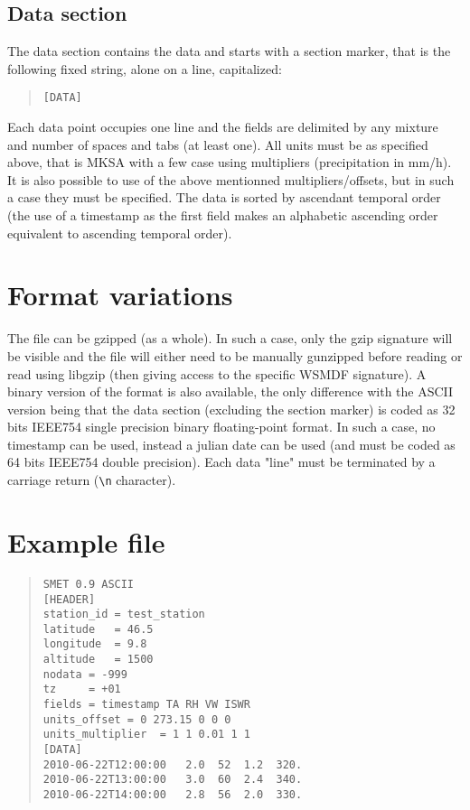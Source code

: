 \documentclass[a4paper,10pt]{article}
\begin{document}
\subsection{Data section}
The data section contains the data and starts with a section marker, that is the following fixed string, alone on a line, capitalized:
\begin{quote} \begin{verbatim}
[DATA]
\end{verbatim}\end{quote}
Each data point occupies one line and the fields are delimited by any mixture and number of spaces and tabs (at least one). All units must be as specified above, that is MKSA with a few case using multipliers (precipitation in mm/h). It is also possible to use of the above mentionned multipliers/offsets, but in such a case they must be specified. The data is sorted by ascendant temporal order (the use of a timestamp as the first field makes an alphabetic ascending order equivalent to ascending temporal order).

\section{Format variations}
The file can be gzipped (as a whole). In such a case, only the gzip signature will be visible and the file will either need to be manually gunzipped before reading or read using libgzip (then giving access to the specific WSMDF signature). A binary version of the format is also available, the only difference with the ASCII version being that the data section (excluding the section marker) is coded as 32 bits IEEE754 single precision binary floating-point format. In such a case, no timestamp can be used, instead a julian date can be used (and must be coded as 64 bits IEEE754 double precision). Each data "line" must be terminated by a carriage return (\verb '\n' character).

\section{Example file}
\begin{quote} \begin{verbatim}
SMET 0.9 ASCII
[HEADER]
station_id = test_station
latitude   = 46.5
longitude  = 9.8
altitude   = 1500
nodata = -999
tz     = +01
fields = timestamp TA RH VW ISWR
units_offset = 0 273.15 0 0 0
units_multiplier  = 1 1 0.01 1 1
[DATA]
2010-06-22T12:00:00   2.0  52  1.2  320.
2010-06-22T13:00:00   3.0  60  2.4  340.
2010-06-22T14:00:00   2.8  56  2.0  330.
\end{verbatim}\end{quote}
\end{document}
